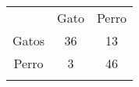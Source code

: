 \documentclass[twocolumn,10pt]{asme2ej}
\begin{document}
\begin{tabular}{ccc}
 & Gato & Perro\\
 Gatos & 36& 13\\
Perro & 3 & 46\\
\label{tbl:confusion_prueba1}
\end{tabular}

\end{document}
